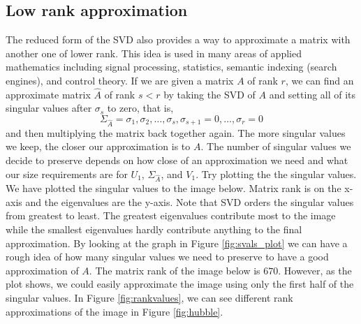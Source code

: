 \subsection*{Low rank approximation}
The reduced form of the SVD also provides a way to approximate a
matrix with another one of lower rank.
This idea is used in many areas of applied mathematics including signal processing, statistics, semantic indexing (search engines), and control theory.
If we are given a matrix $A$ of rank $r$, we can find an approximate matrix $\widehat A$ of rank $s<r$ by taking the SVD of $A$ and setting all of its singular values after $\sigma_s$ to zero, that is,
\begin{equation*}
\Sigma_{\widehat A} = \sigma_1, \sigma_2, \ldots, \sigma_s,\sigma_{s+1}=0,\ldots,\sigma_r=0
\end{equation*}
and then multiplying the matrix back together again.
The more singular values we keep, the closer our approximation is to $A$.
The number of singular values we decide to preserve depends on how close of an approximation we need and what our size requirements are for $U_1$, $\Sigma_{\widehat A}$, and $V_1$.
Try plotting the the singular values.
We have plotted the singular values to the image below.
Matrix rank is on the x-axis and the eigenvalues are the y-axis.
Note that SVD orders the singular values from greatest to least.
The greatest eigenvalues contribute most to the image while the smallest eigenvalues hardly contribute anything to the final approximation.
By looking at the graph in Figure \ref{fig:svals_plot} we can have a rough idea of how many singular values we need to preserve to have a good approximation of $A$.
The matrix rank of the image below is $670$.
However, as the plot shows, we could easily approximate the image using only the first half of the singular values.  In Figure \ref{fig:rankvalues}, we can see different rank approximations of the image in Figure \ref{fig:hubble}.
